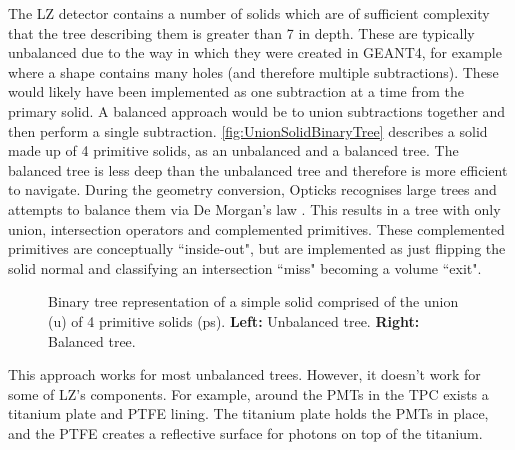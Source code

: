 \par
The LZ detector contains a number of solids which are of sufficient complexity that the tree describing them is greater than 7 in depth.
These are typically unbalanced due to the way in which they were created in GEANT4, for example where a shape contains many holes (and therefore multiple subtractions).
These would likely have been implemented as one subtraction at a time from the primary solid.
A balanced approach would be to union subtractions together and then perform a single subtraction.
\autoref{fig:UnionSolidBinaryTree} describes a solid made up of 4 primitive solids, as an unbalanced and a balanced tree.
The balanced tree is less deep than the unbalanced tree and therefore is more efficient to navigate.
During the geometry conversion, Opticks recognises large trees and attempts to balance them via De Morgan's law \cite{Opticks_CHEP_2019_ref}.
This results in a tree with only union, intersection operators and complemented primitives.
These complemented primitives are conceptually ``inside-out", but are implemented as just flipping the solid normal and classifying an intersection ``miss" becoming a volume ``exit".
\begin{figure}
\centering 
{}
\caption{Binary tree representation of a simple solid comprised of the union (u) of 4 primitive solids (ps). \textbf{Left:} Unbalanced tree. \textbf{Right:} Balanced tree.}
\label{fig:UnionSolidBinaryTree}
\end{figure}
\par
This approach works for most unbalanced trees. 
However, it doesn't work for some of LZ's components.
For example, around the PMTs in the TPC exists a titanium plate and PTFE lining.
The titanium plate holds the PMTs in place, and the PTFE creates a reflective surface for photons on top of the titanium.
